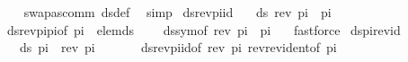 \begin{isabellebody}
%
\isadelimproof
\ \ %
\endisadelimproof
%
\isatagproof
{}\isamarkupfalse%
\ swapas{\isacharunderscore}{\kern0pt}comm\ ds{\isacharunderscore}{\kern0pt}def\ \isamarkupfalse%
\ simp%
\endisatagproof
{\isafoldproof}%
%
\isadelimproof
\isanewline
%
\endisadelimproof
\isanewline
{}\isamarkupfalse%
\ ds{\isacharunderscore}{\kern0pt}rev{\isacharunderscore}{\kern0pt}pi{\isacharunderscore}{\kern0pt}id{\isacharcolon}{\kern0pt}\isanewline
\ \ \ {\isachardoublequoteopen}ds\ {\isacharparenleft}{\kern0pt}rev\ pi\ {\isacharat}{\kern0pt}\ pi{\isacharparenright}{\kern0pt}\ {\isacharbrackleft}{\kern0pt}{\isacharbrackright}{\kern0pt}\ {\isacharequal}{\kern0pt}\ {\isacharbraceleft}{\kern0pt}{\isacharbraceright}{\kern0pt}{\isachardoublequoteclose}\isanewline
%
\isadelimproof
\ \ %
\endisadelimproof
%
\isatagproof
{}\isamarkupfalse%
\ ds{\isacharunderscore}{\kern0pt}rev{\isacharunderscore}{\kern0pt}pi{\isacharunderscore}{\kern0pt}pi{\isacharbrackleft}{\kern0pt}of\ pi\ {\isacartoucheopen}{\isacharbrackleft}{\kern0pt}{\isacharbrackright}{\kern0pt}{\isacartoucheclose}{\isacharbrackright}{\kern0pt}\ elem{\isacharunderscore}{\kern0pt}ds\isanewline
\ \ \ \ ds{\isacharunderscore}{\kern0pt}sym{\isacharbrackleft}{\kern0pt}of\ {\isacartoucheopen}{\isacharparenleft}{\kern0pt}rev\ pi\ {\isacharat}{\kern0pt}\ pi{\isacharparenright}{\kern0pt}{\isacartoucheclose}\ {\isacartoucheopen}{\isacharbrackleft}{\kern0pt}{\isacharbrackright}{\kern0pt}{\isacartoucheclose}{\isacharbrackright}{\kern0pt}\ \isamarkupfalse%
\ fastforce%
\endisatagproof
{\isafoldproof}%
%
\isadelimproof
\isanewline
%
\endisadelimproof
\isanewline
{}\isamarkupfalse%
\ ds{\isacharunderscore}{\kern0pt}pi{\isacharunderscore}{\kern0pt}rev{\isacharunderscore}{\kern0pt}id{\isacharcolon}{\kern0pt}\isanewline
\ \ \ {\isachardoublequoteopen}ds\ {\isacharparenleft}{\kern0pt}pi\ {\isacharat}{\kern0pt}\ rev\ pi{\isacharparenright}{\kern0pt}\ {\isacharbrackleft}{\kern0pt}{\isacharbrackright}{\kern0pt}\ {\isacharequal}{\kern0pt}\ {\isacharbraceleft}{\kern0pt}{\isacharbraceright}{\kern0pt}{\isachardoublequoteclose}\isanewline
%
\isadelimproof
\ \ %
\endisadelimproof
%
\isatagproof
{}\isamarkupfalse%
\ ds{\isacharunderscore}{\kern0pt}rev{\isacharunderscore}{\kern0pt}pi{\isacharunderscore}{\kern0pt}id{\isacharbrackleft}{\kern0pt}of\ {\isacartoucheopen}rev\ pi{\isacartoucheclose}{\isacharbrackright}{\kern0pt}\ rev{\isacharunderscore}{\kern0pt}rev{\isacharunderscore}{\kern0pt}ident{\isacharbrackleft}{\kern0pt}of\ pi{\isacharbrackright}{\kern0pt}\isanewline

\end{isabellebody}
